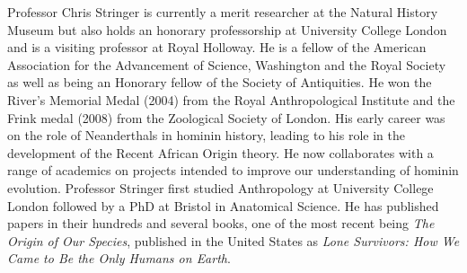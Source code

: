 \documentclass{ijsra}
\begin{document}
\noindent Professor Chris Stringer is currently a merit researcher at the Natural History Museum but also holds
an honorary professorship at University College London and is a visiting professor at Royal Holloway.
He is a fellow of the American Association for the Advancement of Science, Washington and the Royal Society as well as
being an Honorary fellow of the Society of Antiquities. 
He won the River’s Memorial Medal (2004) from the Royal Anthropological Institute and the Frink medal (2008) from
the Zoological Society of London. His early career was on the role of Neanderthals in hominin history,
leading to his role in the development of the Recent African Origin theory.
He now collaborates with a range of academics on projects intended to improve our understanding of hominin evolution.
Professor Stringer first studied Anthropology at University College London followed by a PhD at Bristol in Anatomical Science.
He has published papers in their hundreds and several books, one of the most recent being \emph{The Origin of Our Species},
published in the United States as \emph{Lone Survivors: How We Came to Be the Only Humans on Earth}.

\IJSRAclosing
\end{document}

